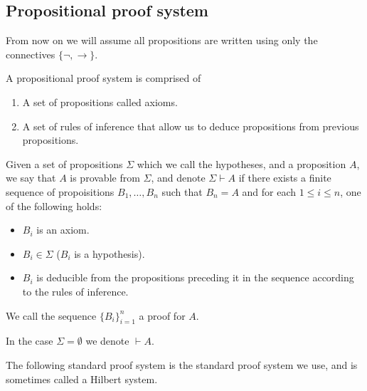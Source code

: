 \documentclass[11pt,a4paper]{article}
\renewcommand{\implies}{\rightarrow}
\begin{document}
\subsection{Propositional proof system}
From now on we will assume all propositions are written using only 
the connectives $\{\neg, \implies\}$.

\begin{definition}
  A propositional proof system is comprised of
  \begin{enumerate}
    \item[(1)] A set of propositions called axioms.
    \item[(2)] A set of rules of inference that allow us to deduce
      propositions from previous propositions.
  \end{enumerate}
\end{definition}

\begin{definition}[Proof]
  Given a set of propositions $\Sigma$ which we call the hypotheses,
  and a proposition $A$, we say that $A$ is provable from $\Sigma$,
  and denote $\Sigma \vdash A$
  if there exists a finite sequence of propoisitions $B_1,\dots,B_n$
  such that $B_n = A$ and for each $1 \le i \le n$, one of the
  following holds:

  \begin{itemize}
    \item $B_i$ is an axiom.
    \item $B_i \in \Sigma$ ($B_i$ is a hypothesis).
    \item $B_i$ is deducible from the propositions preceding it in the 
      sequence according to the rules of inference.
  \end{itemize}

  We call the sequence $\{B_i\}_{i=1}^{n}$ a proof for $A$.
\end{definition}
\begin{remark}
  In the case $\Sigma = \emptyset$ we denote $\vdash A$.
\end{remark}

The following standard proof system is the standard proof system we
use, and is sometimes called a Hilbert system.
\end{document}
